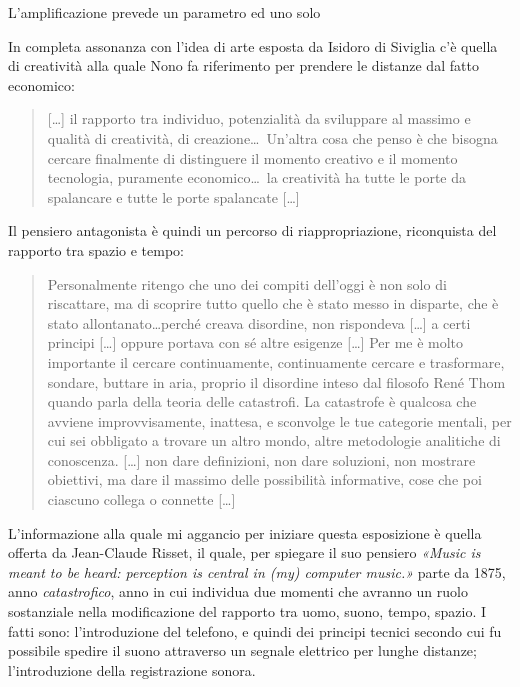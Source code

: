 \documentclass[a4paper,11pt]{article}
\begin{document}
L'amplificazione prevede un parametro ed uno solo

In completa assonanza con l'idea di arte esposta da Isidoro di Siviglia
c'è quella di creatività alla quale Nono fa riferimento per prendere le
distanze dal fatto economico:

\begin{quote}
{[}\ldots{}{]} il rapporto tra individuo, potenzialità da sviluppare al
massimo e qualità di creatività, di creazione\ldots{} Un'altra cosa che
penso è che bisogna cercare finalmente di distinguere il momento
creativo e il momento tecnologia, puramente economico\ldots{} la creatività
ha tutte le porte da spalancare e tutte le porte spalancate {[}\ldots{}{]}
\end{quote}

Il pensiero antagonista è quindi un percorso di riappropriazione,
riconquista del rapporto tra spazio e tempo:

\begin{quote}
Personalmente ritengo che uno dei compiti dell'oggi è non solo di
riscattare, ma di scoprire tutto quello che è stato messo in disparte,
che è stato allontanato\ldots{}perché creava disordine, non rispondeva
{[}\ldots{}{]} a certi principi {[}\ldots{}{]} oppure portava con sé altre esigenze
{[}\ldots{}{]} Per me è molto importante il cercare continuamente,
continuamente cercare e trasformare, sondare, buttare in aria, proprio
il disordine inteso dal filosofo René Thom quando parla della teoria
delle catastrofi. La catastrofe è qualcosa che avviene
improvvisamente, inattesa, e sconvolge le tue categorie mentali, per
cui sei obbligato a trovare un altro mondo, altre metodologie
analitiche di conoscenza. {[}\ldots{}{]} non dare definizioni, non dare
soluzioni, non mostrare obiettivi, ma dare il massimo delle
possibilità informative, cose che poi ciascuno collega o connette
{[}\ldots{}{]}
\end{quote}

L'informazione alla quale mi aggancio per iniziare questa esposizione è
quella offerta da Jean-Claude Risset, il quale, per spiegare il suo
pensiero \emph{«Music is meant to be heard: perception is central in (my)
computer music.»} parte da 1875, anno \emph{catastrofico}, anno in cui
individua due momenti che avranno un ruolo sostanziale nella
modificazione del rapporto tra uomo, suono, tempo, spazio. I fatti sono:
l'introduzione del telefono, e quindi dei principi tecnici secondo cui
fu possibile spedire il suono attraverso un segnale elettrico per lunghe
distanze; l'introduzione della registrazione sonora.
\end{document}
